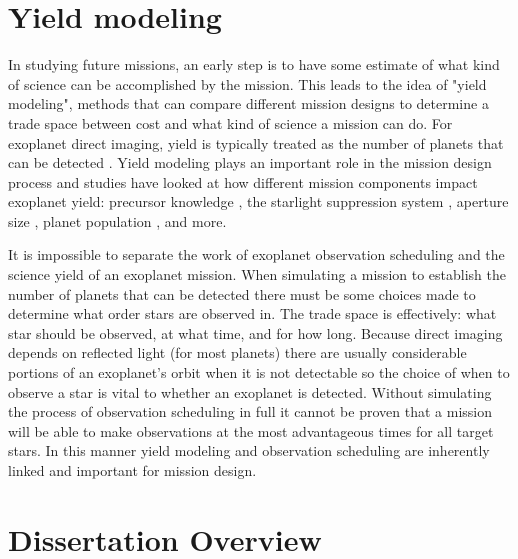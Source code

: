\section{Yield modeling}
\label{sec:intro_yield_modeling}

In studying future missions, an early step is to have some estimate of what
kind of science can be accomplished by the mission. This leads to the idea of
"yield modeling", methods that can compare different mission designs to
determine a trade space between cost and what kind of science a mission can do.
For exoplanet direct imaging, yield is typically treated as the number of
planets that can be detected
\citep{brownSingleVisitPhotometric2005,savranskyAnalyzingDesignsPlanetFinding2010,
starkMaximizingExoEarthCandidate2014}. Yield modeling plays an important role
in the mission design process and studies have looked at how different
mission components impact exoplanet yield: precursor knowledge
\citep{morganFasterExoEarth2021}, the starlight suppression system
\citep{savranskyAnalyzingDesignsPlanetFinding2010,morgan19, Stark2016},
aperture size \citep{starkLowerLimitsAperture2015}, planet population
\citep{savranskyComparisonAnalyticalDepth2016}, and more. 

It is impossible to separate the work of exoplanet observation scheduling and
the science yield of an exoplanet mission. When simulating a mission to
establish the number of planets that can be detected there must be some choices
made to determine what order stars are observed in. The trade space is
effectively: what star should be observed, at what time, and for how long. Because
direct imaging depends on reflected light (for most planets) there are usually
considerable portions of an exoplanet's orbit when it is not detectable so the
choice of when to observe a star is vital to whether an exoplanet is detected.
Without simulating the process of observation scheduling in full it cannot be
proven that a mission will be able to make observations at the most
advantageous times for all target stars. In this manner yield modeling and
observation scheduling are inherently linked and important for mission design.


\section{Dissertation Overview}
\label{sec:dis_overview}

